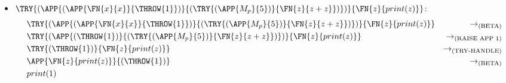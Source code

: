 \begin{itemize}
	\item $\TRY{(\APP{(\APP{\FN{x}{x}}{\THROW{1}})}{(\TRY{(\APP{M_p}{5})}{\FN{z}{z+z}})})}{\FN{z}{print(z)}}$:
	      \begin{align*}
		       & \TRY{(\APP{(\APP{\FN{x}{x}}{\THROW{1}})}{(\TRY{(\APP{M_p}{5})}{\FN{z}{z+z}})})}{\FN{z}{print(z)}}
		       & \to_{\text{(BETA)}}                                                                               \\
		       & \TRY{(\APP{(\THROW{1})}{(\TRY{(\APP{M_p}{5})}{\FN{z}{z+z}})})}{\FN{z}{print(z)}}
		       & \to_{\text{(RAISE APP 1)}}                                                                        \\
		       & \TRY{(\THROW{1})}{\FN{z}{print(z)}}
		       & \to_{\text{(TRY-HANDLE)}}                                                                         \\
		       & \APP{\FN{z}{print(z)}}{(\THROW{1})}
		       & \to_{\text{(BETA)}}                                                                               \\
		       & print(1)
	      \end{align*}
\end{itemize}
